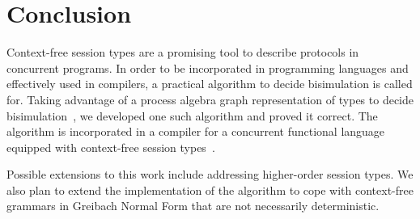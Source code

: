 \section{Conclusion}
\label{sec:conclusion}

Context-free session types are a promising tool to describe protocols
in concurrent programs. In order to be incorporated in programming
languages and effectively used in compilers, a practical algorithm to
decide bisimulation is called for.
%
Taking advantage of a process algebra graph representation of types to
decide
bisimulation~\cite{DBLP:journals/tcs/HirshfeldJM96,DBLP:conf/concur/HirshfeldM94},
we developed one such algorithm and proved it correct. The algorithm
is incorporated in a compiler for a concurrent functional language
equipped with context-free session
types~\cite{almeida.etal_freest-functional-language}.

Possible extensions to this work include
addressing higher-order session types.  We also plan to extend the
implementation of the algorithm to cope with context-free grammars in
Greibach Normal Form that are not necessarily deterministic.



